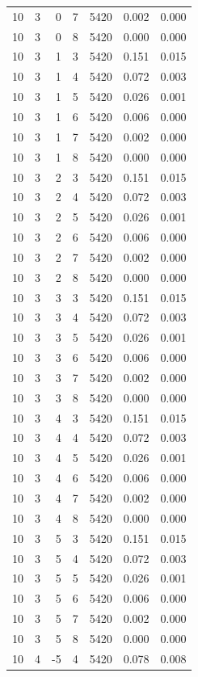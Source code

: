 \begin{table}
\begin{tabular}{rrrrrrr}
10 & 3 & 0 & 7 & 5420 & 0.002 & 0.000 \\
10 & 3 & 0 & 8 & 5420 & 0.000 & 0.000 \\
10 & 3 & 1 & 3 & 5420 & 0.151 & 0.015 \\
10 & 3 & 1 & 4 & 5420 & 0.072 & 0.003 \\
10 & 3 & 1 & 5 & 5420 & 0.026 & 0.001 \\
10 & 3 & 1 & 6 & 5420 & 0.006 & 0.000 \\
10 & 3 & 1 & 7 & 5420 & 0.002 & 0.000 \\
10 & 3 & 1 & 8 & 5420 & 0.000 & 0.000 \\
10 & 3 & 2 & 3 & 5420 & 0.151 & 0.015 \\
10 & 3 & 2 & 4 & 5420 & 0.072 & 0.003 \\
10 & 3 & 2 & 5 & 5420 & 0.026 & 0.001 \\
10 & 3 & 2 & 6 & 5420 & 0.006 & 0.000 \\
10 & 3 & 2 & 7 & 5420 & 0.002 & 0.000 \\
10 & 3 & 2 & 8 & 5420 & 0.000 & 0.000 \\
10 & 3 & 3 & 3 & 5420 & 0.151 & 0.015 \\
10 & 3 & 3 & 4 & 5420 & 0.072 & 0.003 \\
10 & 3 & 3 & 5 & 5420 & 0.026 & 0.001 \\
10 & 3 & 3 & 6 & 5420 & 0.006 & 0.000 \\
10 & 3 & 3 & 7 & 5420 & 0.002 & 0.000 \\
10 & 3 & 3 & 8 & 5420 & 0.000 & 0.000 \\
10 & 3 & 4 & 3 & 5420 & 0.151 & 0.015 \\
10 & 3 & 4 & 4 & 5420 & 0.072 & 0.003 \\
10 & 3 & 4 & 5 & 5420 & 0.026 & 0.001 \\
10 & 3 & 4 & 6 & 5420 & 0.006 & 0.000 \\
10 & 3 & 4 & 7 & 5420 & 0.002 & 0.000 \\
10 & 3 & 4 & 8 & 5420 & 0.000 & 0.000 \\
10 & 3 & 5 & 3 & 5420 & 0.151 & 0.015 \\
10 & 3 & 5 & 4 & 5420 & 0.072 & 0.003 \\
10 & 3 & 5 & 5 & 5420 & 0.026 & 0.001 \\
10 & 3 & 5 & 6 & 5420 & 0.006 & 0.000 \\
10 & 3 & 5 & 7 & 5420 & 0.002 & 0.000 \\
10 & 3 & 5 & 8 & 5420 & 0.000 & 0.000 \\
10 & 4 & -5 & 4 & 5420 & 0.078 & 0.008 \\

\end{tabular}
\end{table}
